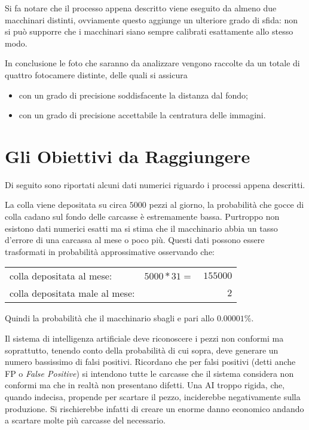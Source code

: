 Si fa notare che il processo appena descritto viene eseguito da almeno due macchinari distinti, ovviamente questo aggiunge un ulteriore grado di sfida: non si può supporre che i macchinari siano sempre calibrati esattamente allo stesso modo.

In conclusione le foto che saranno da analizzare vengono raccolte da un totale di quattro fotocamere distinte, delle quali si assicura
\begin{itemize}
  \item con un grado di precisione soddisfacente la distanza dal fondo;
  \item con un grado di precisione accettabile la centratura delle immagini.
\end{itemize}


\section{Gli Obiettivi da Raggiungere}
Di seguito sono riportati alcuni dati numerici riguardo i processi appena descritti.

La colla viene depositata su circa $5000$ pezzi al giorno, la probabilità che gocce di colla cadano sul fondo delle carcasse è estremamente bassa.
Purtroppo non esistono dati numerici esatti ma si stima che il macchinario abbia un tasso d'errore di una carcassa al mese o poco più.
Questi dati possono essere trasformati in probabilità approssimative osservando che:

\begin{center}
  \begin{tabular}{ l c r }
    colla depositata al mese: & $5000 * 31 =$& $155000$ \\
    colla depositata male al mese: && $2$
  \end{tabular}
\end{center}
Quindi la probabilità che il macchinario sbagli e pari allo $0.00001\%$.

Il sistema di intelligenza artificiale deve riconoscere i pezzi non conformi ma soprattutto, tenendo conto della probabilità di cui sopra, deve generare un numero bassissimo di falsi positivi.
Ricordano che per falsi positivi (detti anche FP o \textit{False Positive}) si intendono tutte le carcasse che il sistema considera non conformi ma che in realtà non presentano difetti.
Una AI troppo rigida, che, quando indecisa, propende per scartare il pezzo, inciderebbe negativamente sulla produzione.
Si rischierebbe infatti di creare un enorme danno economico andando a scartare molte più carcasse del necessario.

